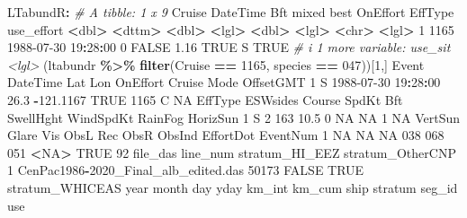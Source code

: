 \documentclass[
]{book}
\newenvironment{Shaded}{\begin{snugshade}}{\end{snugshade}}
\newcommand{\CommentTok}[1]{\textcolor[rgb]{0.56,0.35,0.01}{\textit{#1}}}
\newcommand{\ConstantTok}[1]{\textcolor[rgb]{0.56,0.35,0.01}{#1}}
\newcommand{\DecValTok}[1]{\textcolor[rgb]{0.00,0.00,0.81}{#1}}
\newcommand{\ErrorTok}[1]{\textcolor[rgb]{0.64,0.00,0.00}{\textbf{#1}}}
\newcommand{\FloatTok}[1]{\textcolor[rgb]{0.00,0.00,0.81}{#1}}
\newcommand{\FunctionTok}[1]{\textcolor[rgb]{0.13,0.29,0.53}{\textbf{#1}}}
\newcommand{\NormalTok}[1]{#1}
\newcommand{\SpecialCharTok}[1]{\textcolor[rgb]{0.81,0.36,0.00}{\textbf{#1}}}
\newcommand{\StringTok}[1]{\textcolor[rgb]{0.31,0.60,0.02}{#1}}
\begin{document}
\begin{Shaded}
\begin{Highlighting}[]
\NormalTok{LTabundR}\SpecialCharTok{:}
\CommentTok{\# A tibble: 1 x 9}
\NormalTok{  Cruise DateTime              Bft mixed  best OnEffort EffType use\_effort}
   \SpecialCharTok{\textless{}}\NormalTok{dbl}\SpecialCharTok{\textgreater{}} \ErrorTok{\textless{}}\NormalTok{dttm}\SpecialCharTok{\textgreater{}}              \ErrorTok{\textless{}}\NormalTok{dbl}\SpecialCharTok{\textgreater{}} \ErrorTok{\textless{}}\NormalTok{lgl}\SpecialCharTok{\textgreater{}} \ErrorTok{\textless{}}\NormalTok{dbl}\SpecialCharTok{\textgreater{}} \ErrorTok{\textless{}}\NormalTok{lgl}\SpecialCharTok{\textgreater{}}    \ErrorTok{\textless{}}\NormalTok{chr}\SpecialCharTok{\textgreater{}}   \ErrorTok{\textless{}}\NormalTok{lgl}\SpecialCharTok{\textgreater{}}     
\DecValTok{1}   \DecValTok{1165} \DecValTok{1988{-}07{-}30} \DecValTok{19}\SpecialCharTok{:}\DecValTok{28}\SpecialCharTok{:}\DecValTok{00}     \DecValTok{0} \ConstantTok{FALSE}  \FloatTok{1.16} \ConstantTok{TRUE}\NormalTok{     S       }\ConstantTok{TRUE}      
\CommentTok{\# i 1 more variable: use\_sit \textless{}lgl\textgreater{}}
\NormalTok{(ltabundr }\SpecialCharTok{\%\textgreater{}\%} \FunctionTok{filter}\NormalTok{(Cruise }\SpecialCharTok{==} \DecValTok{1165}\NormalTok{, species }\SpecialCharTok{==} \StringTok{\textquotesingle{}047\textquotesingle{}}\NormalTok{))[}\DecValTok{1}\NormalTok{,]}
\NormalTok{  Event            DateTime  Lat       Lon OnEffort Cruise Mode OffsetGMT}
\DecValTok{1}\NormalTok{     S }\DecValTok{1988{-}07{-}30} \DecValTok{19}\SpecialCharTok{:}\DecValTok{28}\SpecialCharTok{:}\DecValTok{00} \FloatTok{26.3} \SpecialCharTok{{-}}\FloatTok{121.1167}     \ConstantTok{TRUE}   \DecValTok{1165}\NormalTok{    C        }\ConstantTok{NA}
\NormalTok{  EffType ESWsides Course SpdKt Bft SwellHght WindSpdKt RainFog HorizSun}
\DecValTok{1}\NormalTok{       S        }\DecValTok{2}    \DecValTok{163}  \FloatTok{10.5}   \DecValTok{0}        \ConstantTok{NA}        \ConstantTok{NA}       \DecValTok{1}       \ConstantTok{NA}
\NormalTok{  VertSun Glare Vis ObsL Rec ObsR ObsInd EffortDot EventNum}
\DecValTok{1}      \ConstantTok{NA}    \ConstantTok{NA}  \ConstantTok{NA}  \DecValTok{038} \DecValTok{068}  \DecValTok{051}   \SpecialCharTok{\textless{}}\ConstantTok{NA}\SpecialCharTok{\textgreater{}}      \ConstantTok{TRUE}       \DecValTok{92}
\NormalTok{                              file\_das line\_num stratum\_HI\_EEZ stratum\_OtherCNP}
\DecValTok{1}\NormalTok{ CenPac1986}\SpecialCharTok{{-}}\NormalTok{2020\_Final\_alb\_edited.das    }\DecValTok{50173}          \ConstantTok{FALSE}             \ConstantTok{TRUE}
\NormalTok{  stratum\_WHICEAS year month day yday km\_int   km\_cum ship  stratum seg\_id  use}

\end{Highlighting}
\end{Shaded}
\end{document}
